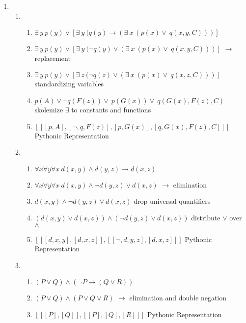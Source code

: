 \documentclass{article}
\begin{document}
\begin{enumerate}
    \item %
    \begin{enumerate}
        \item %
        \begin{enumerate}
            \item $\exists\ y\ p(y) \vee [\exists\ y\ (q(y) \rightarrow (\exists\ x\ (p(x) \vee\ q(x,y,C)))]$
            \item $\exists\ y\ p(y) \vee [\exists\ y\ (\neg q(y) \vee (\exists\ x\ (p(x) \vee\ q(x,y,C)))]$ $\rightarrow$ replacement
            \item $\exists\ y\ p(y) \vee [\exists\ z\ (\neg q(z) \vee (\exists\ x\ (p(x) \vee\ q(x,z,C)))]$ standardizing variables
            \item $p(A) \vee \neg q(F(z)) \vee\ p(G(x)) \vee\ q(G(x),F(z),C)$ skolemize $\exists$ to constants and functions
            \item $[[[p, A], [\neg, q, F(z)], [p, G(x)], [q, G(x), F(z), C]]]$ Pythonic Representation\\
        \end{enumerate}

        \item %
        \begin{enumerate}
            \item $\forall x \forall y \forall x\ d(x,y) \wedge d(y,z) \rightarrow d(x,z)$
            \item $\forall x \forall y \forall x\ d(x,y) \wedge \neg d(y,z) \vee d(x,z)$ $\rightarrow$ elimination
            \item $d(x,y) \wedge \neg d(y,z) \vee d(x,z)$ drop universal quantifiers
            \item $(d(x,y) \vee d(x,z)) \wedge (\neg d(y,z) \vee d(x,z))$ distribute $\vee$ over $\wedge$
            \item $[[[d,x,y],[d,x,z]], [[\neg,d,y,z],[d,x,z]]]$ Pythonic Representation\\
        \end{enumerate}

        \item %
        \begin{enumerate}
            \item $( P \vee Q) \wedge (\neg P \rightarrow (Q \vee R))$
            \item $( P \vee Q) \wedge (P \vee Q \vee R)$ $\rightarrow$ elimination and double negation
            \item $[[[P], [Q]], [[P], [Q], [R]]]$ Pythonic Representation\\
        \end{enumerate}



\end{enumerate}
\end{enumerate}
\end{document}
